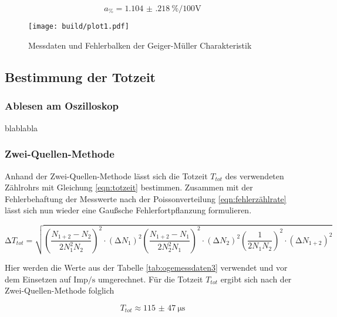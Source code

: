 \begin{flushleft}
\begin{equation}
a_{\si{\percent}} = \SI{1.104(218)}{\percent\per{100}\volt}
\end{equation}

%

\end{flushleft}
\begin{figure}[h]
  \centering
  \texttt{[image: build/plot1.pdf]}
  \caption{Messdaten und Fehlerbalken der Geiger-Müller Charakteristik}
  \label{fig:plot1}
\end{figure}

\subsection{Bestimmung der Totzeit}

\subsubsection{Ablesen am Oszilloskop}
blablabla

\subsubsection{Zwei-Quellen-Methode}
Anhand der Zwei-Quellen-Methode lässt sich die Totzeit $T_{tot}$ des verwendeten Zählrohrs mit Gleichung \eqref{eqn:totzeit} bestimmen.
Zusammen mit der Fehlerbehaftung der Messwerte nach der Poissonverteilung \eqref{eqn:fehlerzählrate} lässt sich nun wieder eine
Gaußsche Fehlerfortpflanzung formulieren.

\begin{equation*}
\increment T_{tot} = \sqrt{\left( \frac{N_{1+2} - N_{2}}{2 N_{1}^{2} N_{2}}\right)^2 \cdot (\increment N_{1})^{2} 
\left( \frac{N_{1+2} - N_{1}}{2 N_{2}^{2} N_{1}}\right)^2 \cdot (\increment N_{2})^{2} 
\left( \frac{1}{2 N_{1} N_{2}}\right)^2 \cdot (\increment N_{1+2})^{2}} 
\end{equation*}

Hier werden die Werte aus der Tabelle \ref{tab:ogemessdaten3} verwendet und vor dem Einsetzen auf $\text{Imp} / \si{\second}$ umgerechnet.
Für die Totzeit $T_{tot}$ ergibt sich nach der Zwei-Quellen-Methode folglich

\begin{equation}
T_{tot} \approx \SI{115(47)}{\micro\second}
\end{equation}